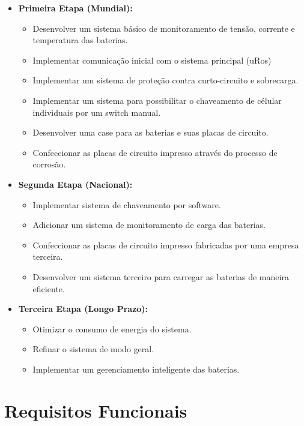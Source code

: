 \documentclass[12pt]{article}
\begin{document}
\begin{itemize}
    \item \textbf{Primeira Etapa (Mundial):}
    \begin{itemize}
        \item Desenvolver um sistema básico de monitoramento de tensão, corrente e temperatura das baterias.
        \item Implementar comunicação inicial com o sistema principal (uRos)
        \item Implementar um sistema de proteção contra curto-circuito e sobrecarga.
        \item Implementar um sistema para possibilitar o chaveamento de célular individuais por um switch manual.
        \item Desenvolver uma case para as baterias e suas placas de circuito.
        \item Confeccionar as placas de circuito impresso através do processo de corrosão.
    \end{itemize}
    \item \textbf{Segunda Etapa (Nacional):}
    \begin{itemize}
        \item Implementar sistema de chaveamento por software.
        \item Adicionar um sistema de monitoramento de carga das baterias.
        \item Confeccionar as placas de circuito impresso fabricadas por uma empresa terceira.
        \item Desenvolver um sistema terceiro para carregar as baterias de maneira eficiente.
    \end{itemize}
    \item \textbf{Terceira Etapa (Longo Prazo):}
    \begin{itemize}
        \item Otimizar o consumo de energia do sistema.
        \item Refinar o sistema de modo geral.
        \item Implementar um gerenciamento inteligente das baterias.
    \end{itemize}

\end{itemize}

\section{Requisitos Funcionais}
\end{document}
